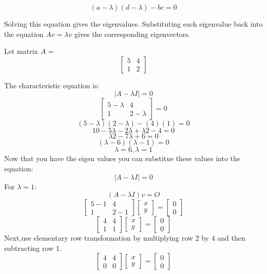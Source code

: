 \begin{equation}
(a - \lambda)(d - \lambda) - bc = 0
\end{equation}

Solving this equation  gives the eigenvalues. Substituting each
eigenvalue back into the equation $Av = \lambda v$ gives the
corresponding eigenvectors.

Let matrix $A$ =
$$\begin{bmatrix}
5 & 4\\
 1 & 2 
\end{bmatrix} $$

The characteristic equation is: 
$$|A - \lambda I| = 0$$ 
$$\begin{bmatrix}
5 - \lambda & 4\\
 1 & 2- \lambda
\end{bmatrix} = 0$$
$$(5 - \lambda) (2 - \lambda) - (4)(1) = 0$$
$$10 - 5\lambda - 2\lambda + \lambda2 - 4 = 0$$
$$\lambda2 - 7\lambda + 6 = 0$$
$$(\lambda - 6)(\lambda - 1) = 0$$
$$\lambda = 6, \lambda = 1$$
Now that you have the eigen values you can substitue these values into the equation: 
$$|A - \lambda I| = 0$$ 
For $λ = 1$:
$$(A - \lambda I) v = O$$
$$\begin{bmatrix}
5-1 & 4 \\
1 & 2-1 
\end{bmatrix}
\begin{bmatrix}
x \\
y 
\end{bmatrix} = 
\begin{bmatrix}
0 \\
0 
\end{bmatrix}$$
$$\begin{bmatrix}
4 & 4\\
1 & 1 
\end{bmatrix}
\begin{bmatrix}
x  \\
y 
\end{bmatrix} = 
\begin{bmatrix}
0  \\
0 
\end{bmatrix}$$
Next,use elementary row transformation by multiplying row 2 by 4 and then subtracting row 1.
$$\begin{bmatrix}
4 & 4\\
0 & 0 
\end{bmatrix}
\begin{bmatrix}
x \\
y 
\end{bmatrix} = 
\begin{bmatrix}
0\\
0
\end{bmatrix}$$

